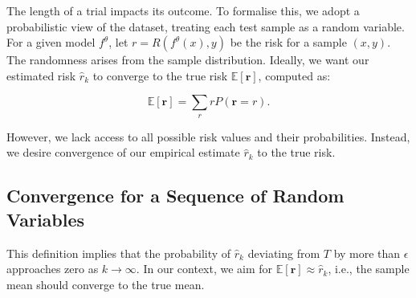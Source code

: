 The length of a trial impacts its outcome. To formalise this, we adopt a probabilistic view of the dataset, treating each test sample as a random variable. For a given model $f^\theta$, let $r = R(f^\theta(x), y)$ be the risk for a sample $(x, y)$. The randomness arises from the sample distribution. Ideally, we want our estimated risk $\hat{r}_k$ to converge to the true risk $\mathbb{E}[\mathbf{r}]$, computed as:

\[
    \mathbb{E}[\mathbf{r}] = \sum_r r P(\mathbf{r} = r).
\]

However, we lack access to all possible risk values and their probabilities. Instead, we desire convergence of our empirical estimate $\hat{r}_k$ to the true risk.

\subsection{Convergence for a Sequence of Random Variables}


This definition implies that the probability of $\hat{r}_k$ deviating from $T$ by more than $\epsilon$ approaches zero as $k \to \infty$. In our context, we aim for $\mathbb{E}[\mathbf{r}] \approx \hat{r}_k$, i.e., the sample mean should converge to the true mean.

